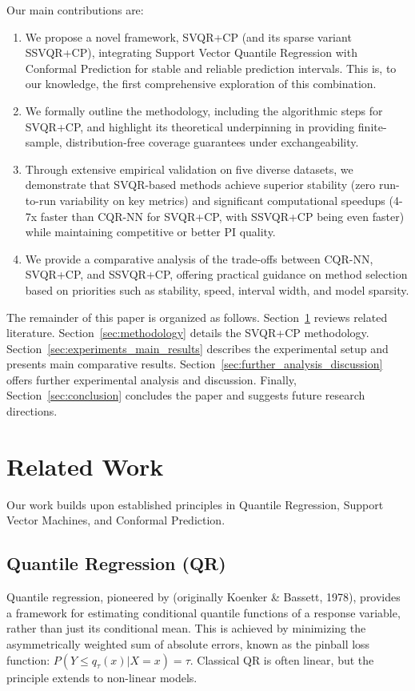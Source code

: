 \documentclass{article}
\begin{document}
Our main contributions are:
\begin{enumerate}[noitemsep, topsep=0pt]
    \item We propose a novel framework, SVQR+CP (and its sparse variant SSVQR+CP), integrating Support Vector Quantile Regression with Conformal Prediction for stable and reliable prediction intervals. This is, to our knowledge, the first comprehensive exploration of this combination.
    \item We formally outline the methodology, including the algorithmic steps for SVQR+CP, and highlight its theoretical underpinning in providing finite-sample, distribution-free coverage guarantees under exchangeability.
    \item Through extensive empirical validation on five diverse datasets, we demonstrate that SVQR-based methods achieve superior stability (zero run-to-run variability on key metrics) and significant computational speedups (4-7x faster than CQR-NN for SVQR+CP, with SSVQR+CP being even faster) while maintaining competitive or better PI quality.
    \item We provide a comparative analysis of the trade-offs between CQR-NN, SVQR+CP, and SSVQR+CP, offering practical guidance on method selection based on priorities such as stability, speed, interval width, and model sparsity.
\end{enumerate}

The remainder of this paper is organized as follows. Section~\ref{sec:related_work} reviews related literature. Section~\ref{sec:methodology} details the SVQR+CP methodology. Section~\ref{sec:experiments_main_results} describes the experimental setup and presents main comparative results. Section~\ref{sec:further_analysis_discussion} offers further experimental analysis and discussion. Finally, Section~\ref{sec:conclusion} concludes the paper and suggests future research directions.

\section{Related Work}
\label{sec:related_work}

Our work builds upon established principles in Quantile Regression, Support Vector Machines, and Conformal Prediction.

\subsection{Quantile Regression (QR)}
Quantile regression, pioneered by \citet{Koenker2005} (originally Koenker & Bassett, 1978), provides a framework for estimating conditional quantile functions of a response variable, rather than just its conditional mean. This is achieved by minimizing the asymmetrically weighted sum of absolute errors, known as the pinball loss function: $P(Y \le q_{\tau}(x) | X=x) = \tau$. Classical QR is often linear, but the principle extends to non-linear models.
\end{document}
